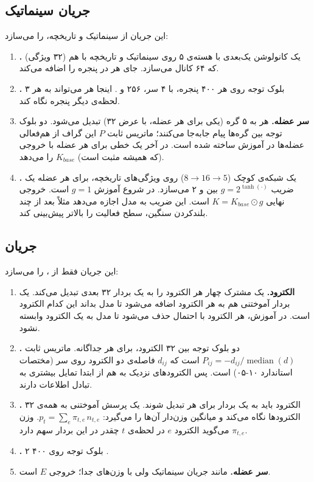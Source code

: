 \subsection{جریان سینماتیک}

این جریان از سینماتیک و تاریخچه،  را می‌سازد:
\begin{enumerate}
\item \textbf{.} یک کانولوشن یک‌بعدی با هسته‌ی ۵ روی سینماتیک و تاریخچه با هم (۳۲ ویژگی) که ۶۴ کانال می‌سازد.  جای هر  در پنجره را اضافه می‌کند.
\item \textbf{.} ۳ بلوک توجه روی هر ۴۰۰  پنجره، با ۴ سر،  ۲۵۶ و  . اینجا هر  می‌تواند به هر لحظه‌ی دیگر پنجره نگاه کند.
\item \textbf{سر عضله.} هر  به ۵ گره (یکی برای هر عضله، با عرض ۳۲) تبدیل می‌شود. دو بلوک توجه بین گره‌ها پیام جابه‌جا می‌کنند؛ ماتریس ثابت $P$ این گراف از هم‌فعالی عضله‌ها در  آموزش ساخته شده است. در آخر یک  خطی برای هر عضله با خروجی  (که همیشه مثبت است) $K_{base}$ را می‌دهد.
\item \textbf{.} یک شبکه‌ی کوچک ($8\to16\to5$) روی ویژگی‌های تاریخچه، برای هر عضله یک ضریب $g=2^{\tanh(\cdot)}$ بین  و ۲ می‌سازد. در شروع آموزش $g=1$ است. خروجی نهایی $K=K_{base}\odot g$ است. این ضریب به مدل اجازه می‌دهد مثلاً بعد از چند بلندکردن سنگین، سطح فعالیت را بالاتر پیش‌بینی کند.
\end{enumerate}

\subsection{جریان }

این جریان فقط از ،  را می‌سازد:
\begin{enumerate}
\item \textbf{ الکترود.} یک  مشترک چهار  هر الکترود را به یک بردار ۳۲ بعدی تبدیل می‌کند. یک بردار آموختنی هم به هر الکترود اضافه می‌شود تا مدل بداند این کدام الکترود است. در آموزش، هر الکترود با احتمال  حذف می‌شود تا مدل به یک الکترود وابسته نشود.
\item \textbf{.} دو بلوک توجه بین ۳۲ الکترود، برای هر  جداگانه. ماتریس ثابت $P_{ij}=-d_{ij}/\operatorname{median}(d)$ است که $d_{ij}$ فاصله‌ی دو الکترود روی سر (مختصات استاندارد ۱۰-۰۵) است. پس الکترودهای نزدیک به هم از ابتدا تمایل بیشتری به تبادل اطلاعات دارند.
\item \textbf{.} ۳۲ الکترود باید به یک بردار برای هر  تبدیل شوند. یک پرسش آموختنی به همه‌ی الکترودها نگاه می‌کند و میانگین وزن‌دار آن‌ها را می‌گیرد: $p_t=\sum_e \pi_{t,e}\,n_{t,e}$. وزن $\pi_{t,e}$ می‌گوید الکترود $e$ در لحظه‌ی $t$ چقدر در این بردار سهم دارد.
\item \textbf{.} ۲ بلوک توجه روی ۴۰۰ .
\item \textbf{سر عضله.} مانند جریان سینماتیک ولی با وزن‌های جدا؛ خروجی $E$ است.
\end{enumerate}

